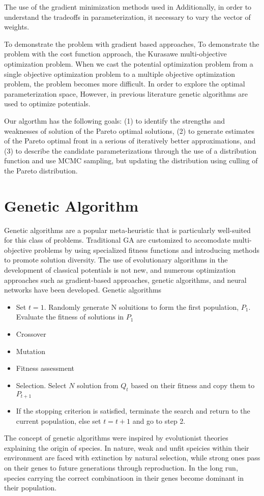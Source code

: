 The use of the gradient minimization methods used in
Additionally, in order to understand the tradeoffs in parameterization, it necessary to vary the vector of weights.

To demonstrate the problem with gradient based approaches,
To demonstrate the problem with the cost function approach, the Kurasawe multi-objective optimization problem\cite{kurasawe1991_pareto}.
When we cast the potential optimization problem from a single objective optimization problem to a multiple objective optimization problem, the problem becomes more difficult.  In order to explore the optimal parameterization space,
However, in previous literature genetic algorithms are used to optimize potentials.

Our algorthm has the following goals: (1) to identify the strengths and weaknesses of solution of the Pareto optimal solutions, (2) to generate estimates of the Pareto optimal front in a serious of iteratively better approximations, and (3) to describe the candidate parameterizations through the use of a distribution function and use MCMC sampling, but updating the distribution using culling of the Pareto distribution.

\section{Genetic Algorithm}

Genetic algorithms are a popular meta-heuristic that is particularly well-suited for this class of problems.  Traditional GA are customized to accomodate multi-objective problems by using specialized fitness functions and introducing methods to promote solution diversity.  The use of evolutionary algorithms in the development of classical potentials is not new, and numerous optimization approaches such as gradient-based approaches, genetic algorithms, and neural networks have been developed.
Genetic algorithms

\begin{itemize}
\item  Set $t=1$.  Randomly generate N soluitions to form the first population, $P_1$.  Evaluate the fitness of solutions in $P_1$
\item Crossover
\item Mutation
\item Fitness assessment
\item Selection.  Select $N$ solution from $Q_t$ based on their fitness and copy them to $P_{t+1}$
\item If the stopping criterion is satisfied, terminate the search and return to the current population, else set $t=t+1$ and go to step 2.
\end{itemize}
The concept of genetic algorithms were inspired by evolutionist theories explaining the origin of species\cite{holland1992_ga}.  In nature, weak and unfit speicies within their environment are faced with extinction by natural selection, while strong ones pass on their genes to future generations through reproduction.  In the long run, species carrying the correct combinatioon in their
    genes become dominant in their population.

